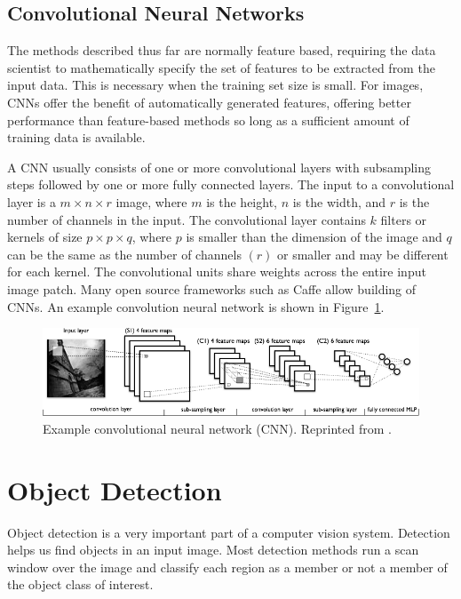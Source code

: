 \subsection{Convolutional Neural Networks}
The methods described thus far are normally feature based, requiring the data scientist to mathematically specify the set of features to be extracted from the input data. This is necessary when the training set size is small. For images, CNNs offer the benefit of automatically generated features, offering better performance than feature-based methods so long as a sufficient amount of training data is available.

A CNN usually consists of one or more convolutional layers with subsampling steps followed by one or more fully connected layers. The input to a convolutional layer is a $ m \times n \times r $ image, where $m$ is the height, $n$ is the width, and $r$ is the number of channels in the input. The convolutional layer contains $k$ filters or kernels of size $ p \times p \times q $, where $p$ is smaller than the dimension of the image and $q$ can be the same as the number of channels $(r)$ or smaller and may be different for each kernel. The convolutional units share weights across the entire input image patch. Many open source frameworks such as Caffe allow building of CNNs. An example convolution neural network is shown in Figure~\ref{fig:cnn}.

\begin{figure}[t]
  \centering
  \includegraphics[width=6in]{figures/cnn.jpg}   
  \caption[Example convolutional neural network (CNN)]{Example convolutional neural network (CNN). Reprinted from .}
  \label{fig:cnn}
\end{figure}



\section{Object Detection}
\label{Object Detection}
Object detection is a very important part of a computer vision system. Detection helps us find objects in an input image. Most detection methods run a scan window over the image and classify each region as a member or not a member of the object class of interest.



